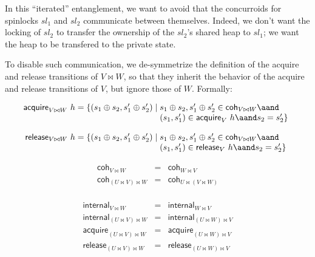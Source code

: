 In this ``iterated'' entanglement, we want to avoid that the
concurroids for spinlocks $sl_1$ and $sl_2$ communicate between
themselves. Indeed, we don't want the locking of $sl_2$ to transfer
the ownership of the $sl_2$'s shared heap to $sl_1$; we want the heap
to be transfered to the private state.

To disable such communication, we de-symmetrize the definition of the
acquire and release transitions of $V \bowtie W$, so that they inherit
the behavior of the acquire and release transitions of $V$, but ignore
those of $W$. Formally:

\[
\begin{array}{l}
\mathsf{acquire}_{V \bowtie W}\ h = \{(s_1 \oplus s_2, s'_1 \oplus s'_2) \mid 
\!\!\!\begin{array}[t]{l}
  s_1 \oplus s_2, s'_1 \oplus s'_2 \in \mathsf{coh}_{V\bowtie W} \aand \hbox{}\\
  (s_1, s'_1) \in \mathsf{acquire}_V\ h \aand s_2 = s'_2\}
\end{array}
\end{array}
\]


\[
\begin{array}{l}
\mathsf{release}_{V \bowtie W}\ h = \{(s_1 \oplus s_2, s'_1 \oplus s'_2) \mid 
\!\!\!\begin{array}[t]{l}
  s_1 \oplus s_2, s'_1 \oplus s'_2 \in \mathsf{coh}_{V\bowtie W} \aand \hbox{}\\
  (s_1, s'_1) \in \mathsf{release}_V\ h \aand s_2 = s'_2\}
\end{array}
\end{array}
\]


\begin{lemma}\label{lemma:entangleAC}
\[
\begin{array}{rcl}
\mathsf{coh}_{V \bowtie W} & = & \mathsf{coh}_{W \bowtie
  V}\\ \mathsf{coh}_{(U \bowtie V) \bowtie W} & = & \mathsf{coh}_{U \bowtie (V \bowtie W)}\\
\end{array}
\]

\[
\begin{array}{rcl}
\mathsf{internal}_{V \bowtie W} & = & \mathsf{internal}_{W \bowtie V}\\
\mathsf{internal}_{(U \bowtie V) \bowtie W} & = & \mathsf{internal}_{(U \bowtie W) \bowtie V}\\
\mathsf{acquire}_{(U \bowtie V) \bowtie W} & = & \mathsf{acquire}_{(U \bowtie W) \bowtie V}\\
\mathsf{release}_{(U \bowtie V) \bowtie W} & = & \mathsf{release}_{(U \bowtie W) \bowtie V}
\end{array}
\]

\end{lemma}


